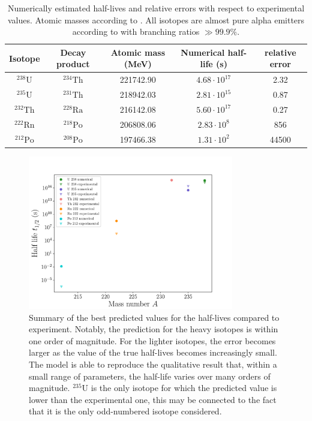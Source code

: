 \documentclass[a4paper,DIV=12,english]{scrartcl}
\begin{document}
\begin{table}
    \centering
    \caption{Numerically estimated half-lives and relative errors with respect to experimental values. Atomic masses according to \cite{Wolfram}. All isotopes are almost pure alpha emitters according to \cite{Wolfram} with branching ratios $\gg 99.9\%$.}
    \begin{tabular}{c|cccc}
        Isotope & Decay product & Atomic mass (MeV) & Numerical half-life (s) & relative error \\
        \hline
        $^{238}\text{U}$ & $^{234}\text{Th}$ & 221742.90 & $4.68\cdot 10^{17}$ & 2.32 \\ 
        $^{235}\text{U}$ & $^{231}\text{Th}$ & 218942.03 & $2.81\cdot 10^{15}$ & 0.87 \\ 
        $^{232}\text{Th}$ & $^{228}\text{Ra}$ & 216142.08 & $5.60\cdot 10^{17}$ & 0.27 \\
        $^{222}\text{Rn}$ & $^{218}\text{Po}$ & 206808.06 & $2.83\cdot 10^{8}$ & 856 \\
        $^{212}\text{Po}$ & $^{208}\text{Po}$ & 197466.38 & $1.31\cdot 10^{2}$ & 44500 \\        
    \end{tabular}
    \label{tab:result}
\end{table}

\begin{figure}
    \centering
    \includegraphics[width=0.8\textwidth]{../plots/summary_t.pdf}
    \caption{Summary of the best predicted values for the half-lives compared to experiment. Notably, the prediction for the heavy isotopes is within one order of magnitude. For the lighter isotopes, the error becomes larger as the value of the true half-lives becomes increasingly small. The model is able to reproduce the qualitative result that, within a small range of parameters, the half-life varies over many orders of magnitude. $^{235}\text{U}$ is the only isotope for which the predicted value is lower than the experimental one, this may be connected to the fact that it is the only odd-numbered isotope considered.}
    \label{fig:summary}
\end{figure}
\end{document}
